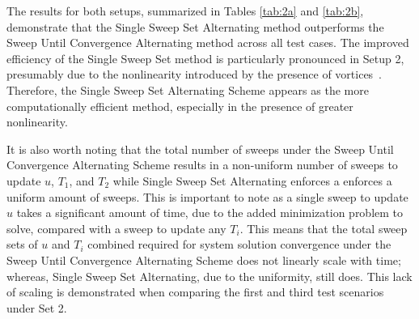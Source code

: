\documentclass[pdflatex,sn-mathphys-num]{sn-jnl}%
\theoremstyle{thmstyleone}%
\theoremstyle{thmstyletwo}%
\theoremstyle{thmstylethree}%
\begin{document}
The results for both setups, summarized in Tables \ref{tab:2a} and \ref{tab:2b}, demonstrate that the Single Sweep Set Alternating method outperforms the Sweep Until Convergence Alternating method across all test cases.  The improved efficiency of the Single Sweep Set method is particularly pronounced in Setup 2, presumably due to the nonlinearity introduced by the presence of vortices~\cite{Miksis2022}.  Therefore, the Single Sweep Set Alternating Scheme appears as the more computationally efficient method, especially in the presence of greater nonlinearity.  

It is also worth noting that the total number of sweeps under the Sweep Until Convergence Alternating Scheme results in a non-uniform number of sweeps to update $u$, $T_1$, and $T_2$ while Single Sweep Set Alternating enforces a enforces a uniform amount of sweeps.  This is important to note as a single sweep to update $u$ takes a significant amount of time, due to the added minimization problem to solve, compared with a sweep to update any $T_i$.  This means that the total sweep sets of $u$ and $T_i$ combined required for system solution convergence under the Sweep Until Convergence Alternating Scheme does not linearly scale with time; whereas, Single Sweep Set Alternating, due to the uniformity, still does.  This lack of scaling is demonstrated when comparing the first and third test scenarios under Set 2.
\end{document}
